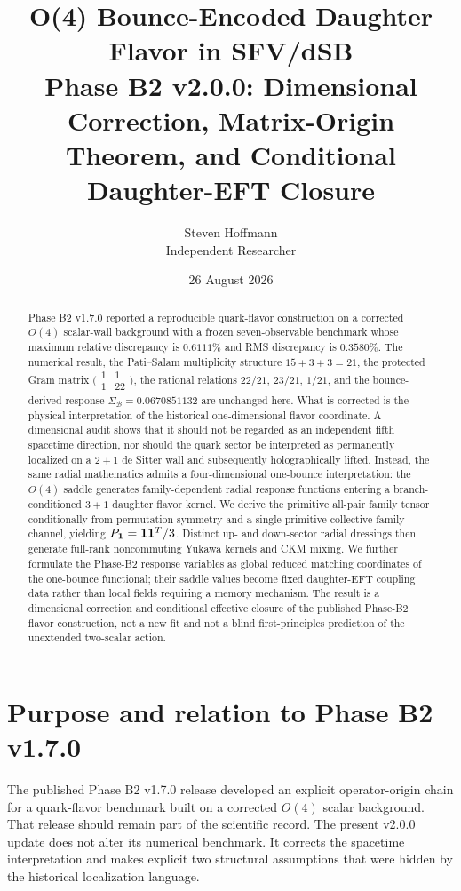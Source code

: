 \documentclass[11pt]{article}
\title{\textbf{O(4) Bounce-Encoded Daughter Flavor in SFV/dSB}\\[0.35em]
\large Phase B2 v2.0.0: Dimensional Correction, Matrix-Origin Theorem, and Conditional Daughter-EFT Closure}
\author{Steven Hoffmann\\Independent Researcher}
\date{26 August 2026}
\begin{document}
\maketitle

\begin{abstract}
Phase B2 v1.7.0 reported a reproducible quark-flavor construction on a corrected $O(4)$ scalar-wall background with a frozen seven-observable benchmark whose maximum relative discrepancy is $0.6111\%$ and RMS discrepancy is $0.3580\%$. The numerical result, the Pati--Salam multiplicity structure $15+3+3=21$, the protected Gram matrix $\bigl(\begin{smallmatrix}1&1\\1&22\end{smallmatrix}\bigr)$, the rational relations $22/21$, $23/21$, $1/21$, and the bounce-derived response $\Sigma_{\mathcal B}=0.0670851132$ are unchanged here. What is corrected is the physical interpretation of the historical one-dimensional flavor coordinate. A dimensional audit shows that it should not be regarded as an independent fifth spacetime direction, nor should the quark sector be interpreted as permanently localized on a $2+1$ de Sitter wall and subsequently holographically lifted. Instead, the same radial mathematics admits a four-dimensional one-bounce interpretation: the $O(4)$ saddle generates family-dependent radial response functions entering a branch-conditioned $3+1$ daughter flavor kernel. We derive the primitive all-pair family tensor conditionally from permutation symmetry and a single primitive collective family channel, yielding $P_{\bf1}=\mathbf 1\mathbf 1^T/3$. Distinct up- and down-sector radial dressings then generate full-rank noncommuting Yukawa kernels and CKM mixing. We further formulate the Phase-B2 response variables as global reduced matching coordinates of the one-bounce functional; their saddle values become fixed daughter-EFT coupling data rather than local fields requiring a memory mechanism. The result is a dimensional correction and conditional effective closure of the published Phase-B2 flavor construction, not a new fit and not a blind first-principles prediction of the unextended two-scalar action.
\end{abstract}

\section{Purpose and relation to Phase B2 v1.7.0}
The published Phase B2 v1.7.0 release \cite{HoffmannPhaseB2} developed an explicit operator-origin chain for a quark-flavor benchmark built on a corrected $O(4)$ scalar background. That release should remain part of the scientific record. The present v2.0.0 update does not alter its numerical benchmark. It corrects the spacetime interpretation and makes explicit two structural assumptions that were hidden by the historical localization language.
\end{document}
